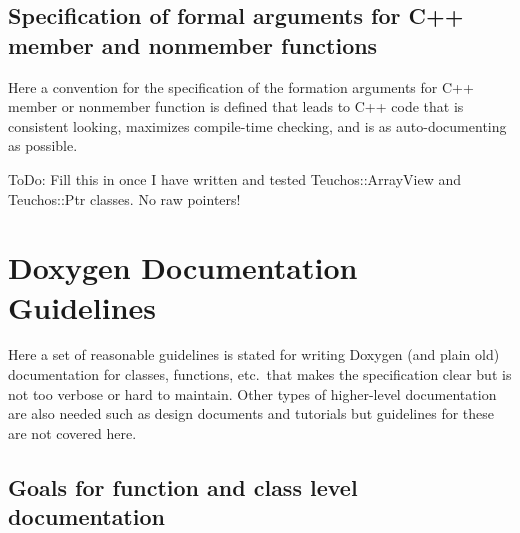 \begin{enumerate}
%
\subsection{Specification of formal arguments for C++ member and nonmember functions}
%

Here a convention for the specification of the formation arguments for C++
member or nonmember function is defined that leads to C++ code that is
consistent looking, maximizes compile-time checking, and is as
auto-documenting as possible.

ToDo: Fill this in once I have written and tested Teuchos::ArrayView and
Teuchos::Ptr classes.  No raw pointers!

\end{enumerate}

%
\section{Doxygen Documentation Guidelines}
%

Here a set of reasonable guidelines is stated for writing Doxygen (and plain
old) documentation for classes, functions, etc.\ that makes the specification
clear but is not too verbose or hard to maintain.  Other types of higher-level
documentation are also needed such as design documents and tutorials but
guidelines for these are not covered here.

%
\subsection{Goals for function and class level documentation}
%

